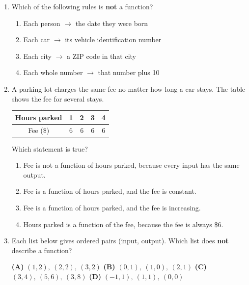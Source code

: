 \documentclass[10pt]{article}
\begin{document}
\begin{enumerate}[leftmargin=1.9em, itemsep=12pt]

\item Which of the following rules is \textbf{not} a function?
      \begin{enumerate}[leftmargin=2.6em, itemsep=2pt]
        \item[(A)] Each person $\to$ the date they were born
        \item[(B)] Each car $\to$ its vehicle identification number
        \item[(C)] Each city $\to$ a ZIP code in that city
        \item[(D)] Each whole number $\to$ that number plus 10
      \end{enumerate}

\item A parking lot charges the same fee no matter how long a car stays. The table shows the
      fee for several stays.

      \begin{center}
      \renewcommand{\arraystretch}{1.3}
      \begin{tabular}{|c|c|c|c|c|}
      \hline
      Hours parked & 1 & 2 & 3 & 4 \\ \hline
      Fee (\$)     & 6 & 6 & 6 & 6 \\ \hline
      \end{tabular}
      \end{center}

      Which statement is true?
      \begin{enumerate}[leftmargin=2.6em, itemsep=2pt]
        \item[(A)] Fee is not a function of hours parked, because every input has the same output.
        \item[(B)] Fee is a function of hours parked, and the fee is constant.
        \item[(C)] Fee is a function of hours parked, and the fee is increasing.
        \item[(D)] Hours parked is a function of the fee, because the fee is always \$6.
      \end{enumerate}

\item Each list below gives ordered pairs (input, output). Which list does \textbf{not} describe a
      function?

      \smallskip
      \textbf{(A)} $(1, 2),\ (2, 2),\ (3, 2)$ \hfill \textbf{(B)} $(0, 1),\ (1, 0),\ (2, 1)$ \hfill
      \textbf{(C)} $(3, 4),\ (5, 6),\ (3, 8)$ \hfill \textbf{(D)} $(-1, 1),\ (1, 1),\ (0, 0)$


\end{enumerate}
\end{document}
